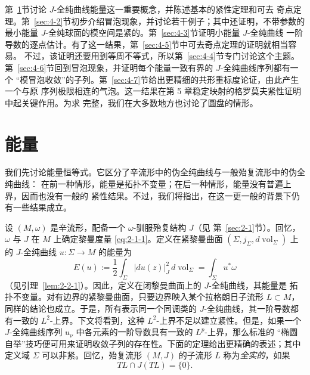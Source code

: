 第~\ref{sec:4-1}节讨论 $J$-全纯曲线能量这一重要概念，并陈述基本的紧性定理和可去
奇点定理。第~\ref{sec:4-2}节初步介绍冒泡现象，并讨论若干例子；其中还证明，不带参数的
最小能量 $J$-全纯球面的模空间是紧的。第~\ref{sec:4-3}节证明小能量 $J$-全纯曲线
一阶导数的逐点估计。有了这一结果，第~\ref{sec:4-5}节中可去奇点定理的证明就相当容易。
不过，该证明还要用到等周不等式，所以第~\ref{sec:4-4}节专门讨论这个主题。
第~\ref{sec:4-6}节回到冒泡现象，并证明每个能量一致有界的 $J$-全纯曲线序列都有一个
“模冒泡收敛”的子列。第~\ref{sec:4-7}节给出更精细的共形重标度论证，由此产生一个与原
序列极限相连的气泡。这一结果在第 5 章稳定映射的格罗莫夫紧性证明中起关键作用。为求
完整，我们在大多数地方也讨论了圆盘的情形。

\section{能量}\label{sec:4-1}

我们先讨论能量恒等式。它区分了辛流形中的伪全纯曲线与一般殆复流形中的伪全纯曲线：
在前一种情形，能量是拓扑不变量；在后一种情形，能量没有普遍上界，因而也没有一般的
紧性结果。不过，我们将指出，在这一更一般的背景下仍有一些结果成立。

设 $(M,\omega)$ 是辛流形，配备一个 $\omega$-驯服殆复结构 $J$（见
第~\ref{sec:2-1}节）。回忆，$\omega$ 与 $J$ 在 $M$ 上确定黎曼度量
\eqref{eq:2-1-1}。定义在紧黎曼曲面
$(\Sigma,j_\Sigma,d\operatorname{vol}_\Sigma)$ 上的 $J$-全纯曲线
$u:\Sigma\to M$ 的能量为
\[
  E(u)
  :=\frac12\int_\Sigma |du(z)|_J^2\,d\operatorname{vol}_\Sigma
  =\int_\Sigma u^*\omega
\]
（见引理~\ref{lem:2-2-1}）。因此，定义在闭黎曼曲面上的 $J$-全纯曲线，其能量是
拓扑不变量。对有边界的紧黎曼曲面，只要边界映入某个拉格朗日子流形 $L\subset M$，
同样的结论也成立。于是，所有表示同一个同调类的 $J$-全纯曲线，其一阶导数都有一致的
$L^2$-上界。下文将看到，这种 $L^2$-上界不足以建立紧性。但是，如果一个
$J$-全纯曲线序列 $u_\nu$ 中各元素的一阶导数具有一致的 $L^p$-上界，那么标准的
“椭圆自举”技巧便可用来证明收敛子列的存在性。下面的定理给出更精确的表述；其中定义域
$\Sigma$ 可以非紧。回忆，殆复流形 $(M,J)$ 的子流形 $L$ 称为\emph{全实的}，如果
\[
  TL\cap J(TL)=\{0\}.
\]

